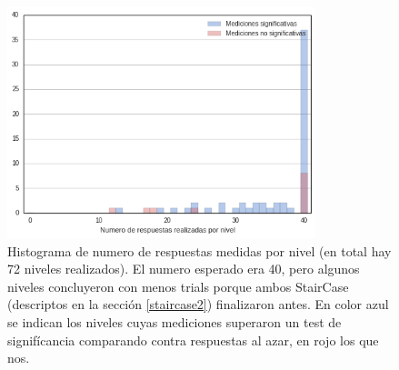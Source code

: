 \documentclass{article}
\begin{document}
	\begin{figure}
        \center
        \includegraphics[width=0.8\textwidth]{Imagenes/Exp1_NroRespuestas.png}
        \caption{Histograma de numero de respuestas medidas por nivel (en total hay 72 niveles realizados). El numero esperado era 40, pero algunos niveles concluyeron con menos trials porque ambos StairCase (descriptos en la sección \ref{staircase2}) finalizaron antes. En color azul se indican los niveles cuyas mediciones superaron un test de signifícancia comparando contra respuestas al azar, en rojo los que nos.}
        \label{fig:histoTrialsxNivel}
    \end{figure}  
	
\end{document}
